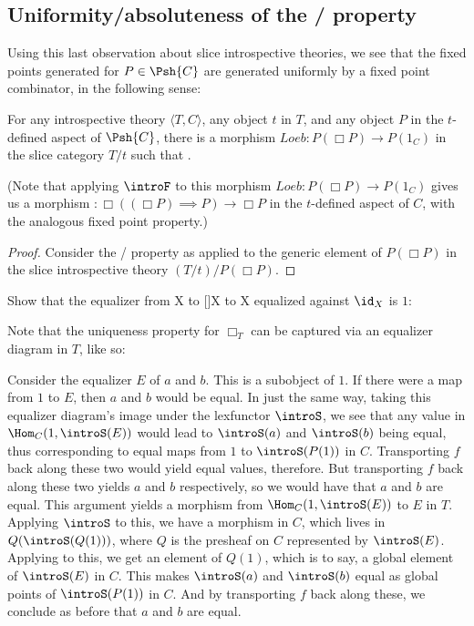 \subsection{Uniformity/absoluteness of the \Loeb/ property}

Using this last observation about slice introspective theories, we see that the fixed points generated for $P \in \Psh{C}$ are generated uniformly by a fixed point combinator, in the following sense:
\begin{theorem}
For any introspective theory $\langle T, C \rangle$, any object $t$ in $T$, and any object $P$ in the $t$-defined aspect of $\Psh{C}$, there is a morphism $Loeb : P(\Box P) \to P(1_C)$ in the slice category $T/t$ such that \TODO.

(Note that applying $\introF$ to this morphism $Loeb : P(\Box P) \to P(1_C)$ gives us a morphism $: \Box((\Box P) \implies P) \to \Box P$ in the $t$-defined aspect of $C$, with the analogous fixed point property.)
\end{theorem}
\begin{proof}
Consider the \Loeb/ property as applied to the generic element of $P(\Box P)$ in the slice introspective theory $(T/t)/P(\Box P)$.
\end{proof}

\begin{TODOblock}
Show that the equalizer from X to []X to X equalized against $\id_X$ is $1$:

Note that the uniqueness property for $\Box_T$ can be captured via an equalizer diagram in $T$, like so: 

Consider the equalizer $E$ of $a$ and $b$. This is a subobject of $1$. If there were a map from $1$ to $E$, then $a$ and $b$ would be equal. In just the same way, taking this equalizer diagram's image under the lexfunctor $\introS$, we see that any value in $\Hom_C(1, \introS(E))$ would lead to $\introS(a)$ and $\introS(b)$ being equal, thus corresponding to equal maps from $1$ to $\introS(P(1))$ in $C$. Transporting $f$ back along these two would yield equal values, therefore. But transporting $f$ back along these two yields $a$ and $b$ respectively, so we would have that $a$ and $b$ are equal. This argument yields a morphism from $\Hom_C(1, \introS(E))$ to $E$ in $T$. Applying $\introS$ to this, we have a morphism in $C$, which lives in $Q(\introS(Q(1)))$, where $Q$ is the presheaf on $C$ represented by $\introS(E)$. Applying  to this, we get an element of $Q(1)$, which is to say, a global element of $\introS(E)$ in $C$. This makes $\introS(a)$ and $\introS(b)$ equal as global points of $\introS(P(1))$ in $C$. And by transporting $f$ back along these, we conclude as before that $a$ and $b$ are equal. 
\end{TODOblock}
\fileend